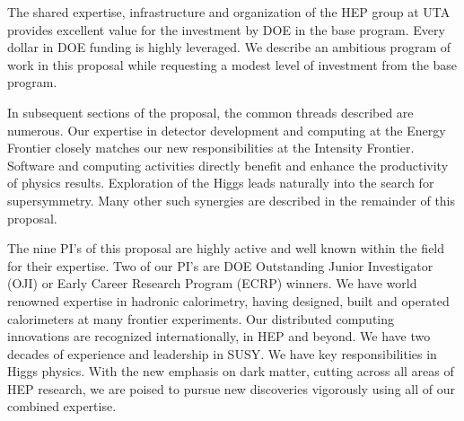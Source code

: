 The shared expertise, infrastructure and organization of the HEP group at UTA provides excellent value for the investment by DOE in the base program. Every dollar in DOE funding is highly leveraged. We describe an ambitious program of work in this proposal while requesting a modest level of investment from the base program.

In subsequent sections of the proposal, the common threads described are numerous. Our expertise in detector development and computing at the Energy Frontier closely matches our new responsibilities at the Intensity Frontier. Software and computing activities directly benefit and enhance the productivity of physics results. Exploration of the Higgs leads naturally into the search for supersymmetry. Many other such synergies are described in the remainder of this proposal.

The nine PI's of this proposal are highly active and well known within the field for their expertise. Two of our PI's are DOE Outstanding Junior Investigator (OJI) or Early Career Research Program (ECRP) winners. We have world renowned expertise in hadronic calorimetry, having designed, built and operated calorimeters at many frontier experiments. Our distributed computing innovations are recognized internationally, in HEP and beyond. We have two decades of experience and leadership in SUSY. We have key responsibilities in Higgs physics. With the new emphasis on dark matter, cutting across all areas of HEP research, we are poised to pursue new discoveries vigorously using all of our combined expertise.
%
